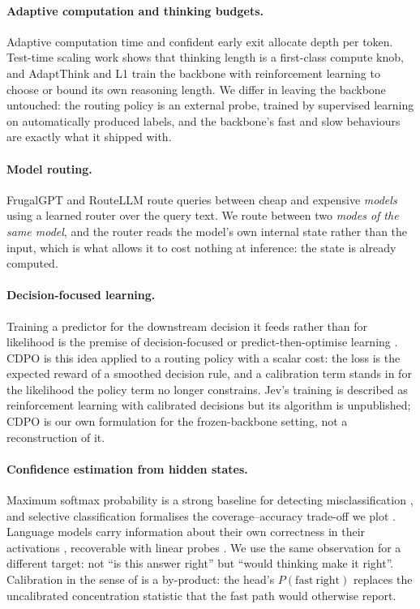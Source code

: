\documentclass{article}
\newcommand{\fast}{\mathrm{fast}}
\newcommand{\cdpo}{CDPO}
\begin{document}
\paragraph{Adaptive computation and thinking budgets.}
Adaptive computation time \citep{graves2016act} and confident early exit \citep{schuster2022calm} allocate depth per token. Test-time scaling work \citep{snell2024scaling,muennighoff2025s1} shows that thinking length is a first-class compute knob, and AdaptThink \citep{zhang2025adaptthink} and L1 \citep{aggarwal2025l1} train the backbone with reinforcement learning to choose or bound its own reasoning length. We differ in leaving the backbone untouched: the routing policy is an external probe, trained by supervised learning on automatically produced labels, and the backbone's fast and slow behaviours are exactly what it shipped with.

\paragraph{Model routing.}
FrugalGPT \citep{chen2023frugalgpt} and RouteLLM \citep{ong2024routellm} route queries between cheap and expensive \emph{models} using a learned router over the query text. We route between two \emph{modes of the same model}, and the router reads the model's own internal state rather than the input, which is what allows it to cost nothing at inference: the state is already computed.

\paragraph{Decision-focused learning.}
Training a predictor for the downstream decision it feeds rather than for likelihood is the premise of decision-focused or predict-then-optimise learning \citep{elmachtoub2022spo,wilder2019melding}. \cdpo{} is this idea applied to a routing policy with a scalar cost: the loss is the expected reward of a smoothed decision rule, and a calibration term stands in for the likelihood the policy term no longer constrains. Jev's training is described as reinforcement learning with calibrated decisions \citep{typesafe2026jev} but its algorithm is unpublished; \cdpo{} is our own formulation for the frozen-backbone setting, not a reconstruction of it.

\paragraph{Confidence estimation from hidden states.}
Maximum softmax probability is a strong baseline for detecting misclassification \citep{hendrycks2017baseline}, and selective classification formalises the coverage--accuracy trade-off we plot \citep{geifman2017selective}. Language models carry information about their own correctness in their activations \citep{kadavath2022know,azaria2023internal}, recoverable with linear probes \citep{alain2017probes}. We use the same observation for a different target: not ``is this answer right'' but ``would thinking make it right''. Calibration in the sense of \citet{guo2017calibration} is a by-product: the head's $P(\fast\ \text{right})$ replaces the uncalibrated concentration statistic that the fast path would otherwise report.
\end{document}
